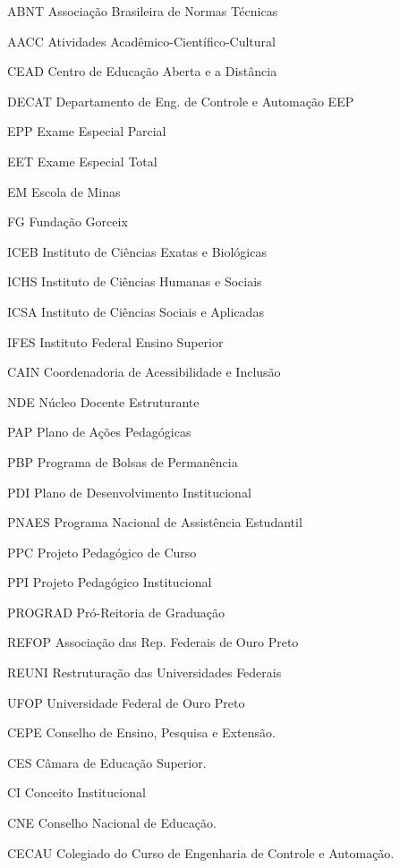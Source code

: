 \documentclass[
	12pt,				%
	openright,			%
	oneside,			%
	a4paper,			%
	english,			%
	brazil				%
	]{abntex2}
\begin{document}
\begin{siglas}
  \item[ABNT] Associação Brasileira de Normas Técnicas
  \item[AACC] Atividades Acadêmico-Científico-Cultural
  \item[CEAD] Centro de Educação Aberta e a Distância
  \item[DECAT] Departamento de Eng. de Controle e Automação EEP \item[EPP] Exame Especial Parcial
  \item[EET] Exame Especial Total
  \item[EM] Escola de Minas
  \item[FG] Fundação Gorceix
  \item[ICEB] Instituto de Ciências Exatas e Biológicas
  \item[ICHS] Instituto de Ciências Humanas e Sociais
  \item[ICSA] Instituto de Ciências Sociais e Aplicadas
  \item[IFES] Instituto Federal Ensino Superior
  \item[CAIN] Coordenadoria de Acessibilidade e Inclusão
  \item[NDE] Núcleo Docente Estruturante
  \item[PAP] Plano de Ações Pedagógicas
  \item[PBP] Programa de Bolsas de Permanência
  \item[PDI] Plano de Desenvolvimento Institucional
  \item[PNAES] Programa Nacional de Assistência Estudantil
  \item[PPC] Projeto Pedagógico de Curso
  \item[PPI] Projeto Pedagógico Institucional
  \item[PROGRAD] Pró-Reitoria de Graduação
  \item[REFOP] Associação das Rep. Federais de Ouro Preto
  \item[REUNI] Restruturação das Universidades Federais
  \item[UFOP] Universidade Federal de Ouro Preto
 \item[CEPE] Conselho de Ensino, Pesquisa e Extensão.
\item[CES] Câmara de Educação Superior.
\item[CI] Conceito Institucional
\item[CNE] Conselho Nacional de Educação.
\item[CECAU] Colegiado do Curso de Engenharia de Controle e Automação.

\end{siglas}
\end{document}
